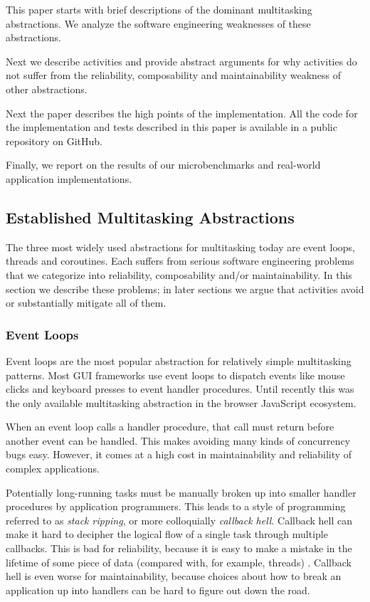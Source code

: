 \documentclass[10pt,preprint]{sigplanconf}
\begin{document}
This paper starts with brief descriptions of the dominant multitasking abstractions.
We analyze the software engineering weaknesses of these abstractions.

Next we describe activities and provide abstract arguments for why activities do not suffer from the reliability, composability and maintainability weakness of other abstractions.

Next the paper describes the high points of the \charcoal implementation.
All the code for the implementation and tests described in this paper is available in a public repository on GitHub.

Finally, we report on the results of our microbenchmarks and real-world application implementations.

\subsection{Established Multitasking Abstractions}

The three most widely used abstractions for multitasking today are event loops, threads and coroutines.
Each suffers from serious software engineering problems that we categorize into reliability, composability and/or maintainability.
In this section we describe these problems; in later sections we argue that activities avoid or substantially mitigate all of them.

\subsubsection{Event Loops}

Event loops are the most popular abstraction for relatively simple multitasking patterns.
Most GUI frameworks use event loops to dispatch events like mouse clicks and keyboard presses to event handler procedures.
Until recently this was the only available multitasking abstraction in the browser JavaScript ecosystem.

When an event loop calls a handler procedure, that call must return before another event can be handled.
This makes avoiding many kinds of concurrency bugs easy.
However, it comes at a high cost in maintainability and reliability of complex applications.

Potentially long-running tasks must be manually broken up into smaller handler procedures by application programmers.
This leads to a style of programming referred to as \emph{stack ripping}\cite{Adya2002}, or more colloquially \emph{callback hell}.
Callback hell can make it hard to decipher the logical flow of a single task through multiple callbacks.
This is bad for reliability, because it is easy to make a mistake in the lifetime of some piece of data (compared with, for example, threads) \cite{Behren2003a}.
Callback hell is even worse for maintainability, because choices about how to break an application up into handlers can be hard to figure out down the road.
\end{document}
